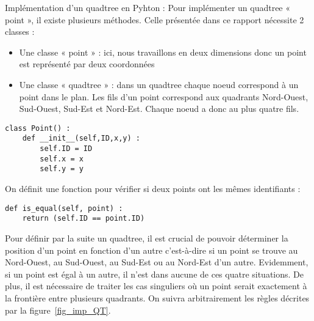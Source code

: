 \documentclass{report}
\begin{document}
Implémentation d’un quadtree en Pyhton :
Pour implémenter un quadtree « point », il existe plusieurs méthodes. Celle présentée dans ce rapport nécessite 2 classes :
\begin{itemize}
\item Une classe « point » : ici, nous travaillons en deux dimensions donc un point est représenté par deux coordonnées
\item Une classe « quadtree » : dans un quadtree chaque noeud correspond à un point dans le plan. Les fils d’un point correspond aux quadrants Nord-Ouest, Sud-Ouest, Sud-Est et Nord-Est. Chaque noeud a donc au plus quatre fils.
\end{itemize}

\begin{lstlisting}
class Point() :
	def __init__(self,ID,x,y) :
		self.ID = ID
		self.x = x
		self.y = y
\end{lstlisting}

On définit une fonction pour vérifier si deux points ont les mêmes identifiants : 
\begin{lstlisting}
def is_equal(self, point) :
	return (self.ID == point.ID)
\end{lstlisting}

Pour définir par la suite un quadtree, il est crucial de pouvoir déterminer la position d’un point en fonction d’un autre c’est-à-dire si un point se trouve au Nord-Ouest, au Sud-Ouest, au Sud-Est ou au Nord-Est d’un autre. Evidemment, si un point est égal à un autre, il n'est dans aucune de ces quatre situations. De plus, il est nécessaire de traiter les cas singuliers où un point serait exactement à la frontière entre plusieurs quadrants. On suivra arbitrairement les règles décrites par la figure~\ref{fig_imp_QT}.
\end{document}
